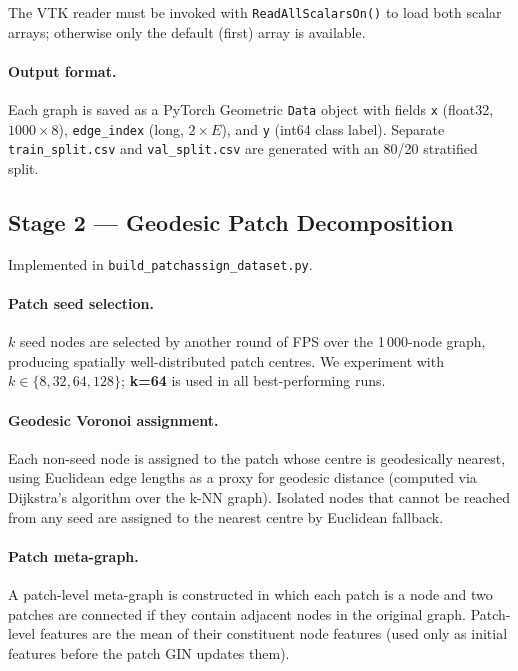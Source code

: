 The VTK reader must be invoked with \texttt{ReadAllScalarsOn()} to load both
scalar arrays; otherwise only the default (first) array is available.

\paragraph{Output format.}
Each graph is saved as a PyTorch Geometric \texttt{Data} object with fields
\texttt{x} (float32, $1000 \times 8$), \texttt{edge\_index} (long, $2 \times
E$), and \texttt{y} (int64 class label).
Separate \texttt{train\_split.csv} and \texttt{val\_split.csv} are generated
with an 80/20 stratified split.

\subsection{Stage 2 --- Geodesic Patch Decomposition}
\label{sec:pipeline:patch}

Implemented in \texttt{build\_patchassign\_dataset.py}.

\paragraph{Patch seed selection.}
$k$ seed nodes are selected by another round of FPS over the 1\,000-node
graph, producing spatially well-distributed patch centres.
We experiment with $k \in \{8, 32, 64, 128\}$; \textbf{k=64} is used in all
best-performing runs.

\paragraph{Geodesic Voronoi assignment.}
Each non-seed node is assigned to the patch whose centre is geodesically
nearest, using Euclidean edge lengths as a proxy for geodesic distance
(computed via Dijkstra's algorithm over the k-NN graph).
Isolated nodes that cannot be reached from any seed are assigned to the
nearest centre by Euclidean fallback.

\paragraph{Patch meta-graph.}
A patch-level meta-graph is constructed in which each patch is a node and
two patches are connected if they contain adjacent nodes in the original graph.
Patch-level features are the mean of their constituent node features (used only
as initial features before the patch GIN updates them).

